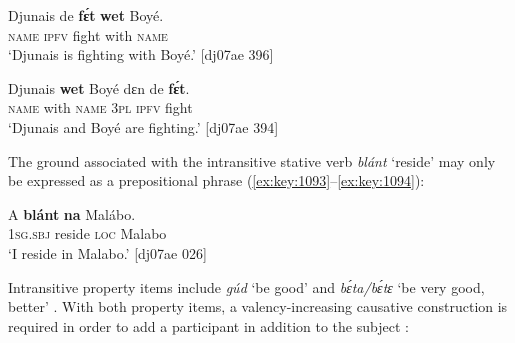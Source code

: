 \z


\ea%
    \label{ex:key:1091}
    \gll Djunais  de  \textbf{fɛ́t}    \textbf{wet}    Boyé.\\
\textsc{name}  \textsc{ipfv}  fight  with    \textsc{name}\\

\glt ‘Djunais is fighting with Boyé.’ [dj07ae 396]
\z


\ea%
    \label{ex:key:1092}
    \gll Djunais  \textbf{wet}    Boyé  dɛn  de  \textbf{fɛ́t}.\\
\textsc{name}  with    \textsc{name}  \textsc{3pl}  \textsc{ipfv}  fight\\

\glt ‘Djunais and Boyé are fighting.’ [dj07ae 394]
\z

The ground associated with the intransitive stative verb \textit{blánt} ‘reside’ may only be expressed as a prepositional phrase (\ref{ex:key:1093}–\ref{ex:key:1094}): 


\z


\ea%
    \label{ex:key:1094}
    \gll A    \textbf{blánt}  \textbf{na} Malábo.\\
\textsc{1sg.sbj}  reside  \textsc{loc}  Malabo\\

\glt ‘I reside in Malabo.’ [dj07ae 026]
\z

Intransitive property items include \textit{gúd} ‘be good’  and \textit{bɛ́ta/bɛ́tɛ} ‘be very good, better’ . With both property items, a valency-increasing causative construction is required in order to add a participant in addition to the subject : 


\z


\z



